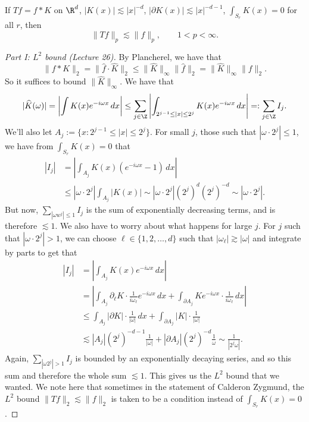 \providecommand{\fint}{\mathop{\rlap{\hspace{0.18em}$-$}\!\int}}
\begin{theorem}
If $Tf=f*K$ on $\R^d$, $|K(x)|\lesssim |x|^{-d}$, $|\partial K(x)|\lesssim |x|^{-d-1}$, $\int_{S_r}K(x)=0$ for all $r$, then
\[\|Tf\|_p\lesssim\|f\|_p,\qquad 1<p<\infty.\]
\end{theorem}
\begin{proof}[Part I: $L^2$ bound (Lecture 26)]
By Plancherel, we have that
\[\|f*K\|_2=\|\widehat f\cdot\widehat K\|_2\leq\|\widehat K\|_\infty\|\widehat f\|_2=\|\widehat K\|_\infty\|f\|_2.\]
So it suffices to bound $\|\widehat K\|_\infty$. We have that
\[|\widehat K(\omega)|=\left|\int K(x)e^{-i\omega x}\,dx\right|\leq\sum_{j\in\Z}\left|\int_{2^{j-1}\leq|x|\leq2^j}K(x)e^{-i\omega x}\,dx\right|=:\sum_{j\in\Z}I_j.\]
We'll also let $A_j:=\{x:2^{j-1}\leq|x|\leq2^j\}$. For small $j$, those such that $|\omega\cdot2^j|\leq1$, we have from $\int_{S_r}K(x)=0$ that
\begin{align*}
|I_j|&=\left|\int_{A_j}K(x)(e^{-i\omega x}-1)\,dx\right|\\
&\leq|\omega\cdot2^j|\int_{A_j}|K(x)|\sim|\omega\cdot2^j|(2^j)^d(2^j)^{-d}\sim|\omega\cdot2^j|.
\end{align*}
But now, $\sum_{|\omega w^j|\leq1}I_j$ is the sum of exponentially decreasing terms, and is therefore $\lesssim1$. We also have to worry about what happens for large $j$. For $j$ such that $|\omega\cdot2^j|>1$, we can choose $\ell\in\{1,2,\ldots,d\}$ such that $|\omega_\ell|\gtrsim|\omega|$ and integrate by parts to get that
\begin{align*}
|I_j|&=\left|\int_{A_j}K(x)e^{-i\omega x}\,dx\right|\\
&=\left|\int_{A_j}\partial_\ell K\cdot\frac1{i\omega_\ell}e^{-i\omega x}\,dx+\int_{\partial A_j}Ke^{-i\omega x}\cdot\frac1{i\omega_\ell}\,dx\right|\\
&\leq\int_{A_j}|\partial K|\cdot\frac1{|\omega|}\,dx+\int_{\partial A_j}|K|\cdot\frac1{|\omega|}\\
&\lesssim|A_j|(2^j)^{-d-1}\frac1{|\omega|}+|\partial A_j|(2^j)^{-d}\frac1\omega
\sim\frac1{|2^j\omega|}.
\end{align*}
Again, $\sum_{|\omega2^j|>1}I_j$ is bounded by an exponentially decaying series, and so this sum and therefore the whole sum $\lesssim1$. This gives us the $L^2$ bound that we wanted. We note here that sometimes in the statement of Calderon Zygmund, the $L^2$ bound $\|Tf\|_2\lesssim\|f\|_2$ is taken to be a condition instead of $\int_{S_r}K(x)=0$.
\end{proof}
